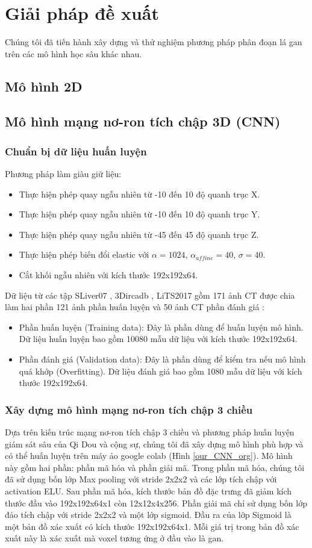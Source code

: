 \chapter{Giải pháp đề xuất}
Chúng tôi đã tiến hành xây dựng và thử nghiệm phương pháp phân đoạn lá gan trên các mô hình học sâu khác nhau.
\section{Mô hình 2D}
\section{Mô hình mạng nơ-ron tích chập 3D (CNN)}
\subsection{Chuẩn bị dữ liệu huấn luyện}
Phương pháp làm giàu giữ liệu:
\begin{itemize}
\item Thực hiện phép quay ngẫu nhiên từ -10 đến 10 độ quanh trục X.
\item Thực hiện phép quay ngẫu nhiên từ -10 đến 10 độ quanh trục Y.
\item Thực hiện phép quay ngẫu nhiên từ -45 đến 45 độ quanh trục Z.
\item Thực hiện phép biến đổi elastic với $\alpha = 1024$, $\alpha_{affine} = 40$, $\sigma = 40 $.
\item Cắt khối ngẫu nhiên với kích thước 192x192x64.
\end{itemize}
Dữ liệu từ các tập SLiver07 \cite{website:slvier07}, 3Dircadb \cite{website:data_3DIRCADb}, LiTS2017 \cite{website:LiTS} gồm 171 ảnh CT được chia làm hai phần 121 ảnh phần huấn luyện và 50 ảnh CT phần đánh giá :
\begin{itemize}
\item Phần huấn luyện (Training data): Đây là phần dùng để huấn luyện mô hình. Dữ liệu huấn luyện bao gồm 10080 mẫu dữ liệu với kích thước 192x192x64.
\item Phần đánh giá (Validation data): Đây là phần dùng để kiểm tra nếu mô hình quá khớp (Overfitting). Dữ liệu đánh giá bao gồm 1080 mẫu dữ liệu với kích thước 192x192x64.
\end{itemize}
\subsection{Xây dựng mô hình mạng nơ-ron tích chập 3 chiều}
Dựa trên kiến trúc mạng nơ-ron tích chập 3 chiều và phương pháp huấn luyện giám sát sâu\cite{dsn_paper} của Qi Dou và cộng sự, chúng tôi đã xây dựng mô hình phù hợp và có thể huấn luyện trên máy ảo google colab (Hình \ref{our_CNN_org}). Mô hình này gồm hai phần: phần mã hóa và phần giải mã. Trong phần mã hóa, chúng tôi đã sử dụng bốn lớp Max pooling với stride 2x2x2 và các lớp tích chập với activation ELU. Sau phần mã hóa, kích thước bản đồ đặc trưng đã giảm kích thước đầu vào 192x192x64x1 còn 12x12x4x256. Phần giải mã chỉ sử dụng bốn lớp đảo tích chập với stride 2x2x2 và một lớp sigmoid. Đầu ra của lớp Sigmoid là một bản đồ xác xuất có kích thước 192x192x64x1. Mỗi giá trị trong bản đồ xác xuất này là xác xuất mà voxel tương ứng ở đầu vào là gan.

